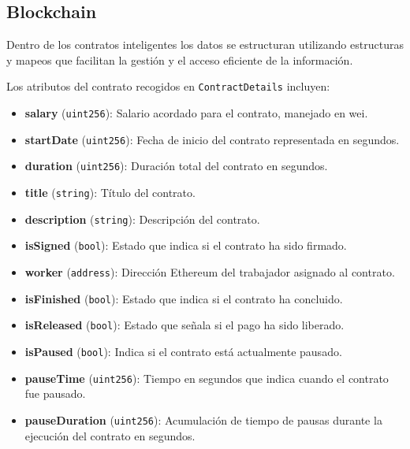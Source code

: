 \subsection{Blockchain}

Dentro de los contratos inteligentes los datos se estructuran utilizando estructuras y mapeos que facilitan la gestión y el acceso eficiente de la información. 

Los atributos del contrato recogidos en  \texttt{ContractDetails} incluyen:
\begin{itemize}
    \item \textbf{salary} (\texttt{uint256}): Salario acordado para el
 	 contrato, manejado en wei.
    \item \textbf{startDate} (\texttt{uint256}): Fecha de inicio del
     contrato representada en segundos.
    \item \textbf{duration} (\texttt{uint256}): Duración total del contrato
     en segundos.
    \item \textbf{title} (\texttt{string}): Título del contrato.
    \item \textbf{description} (\texttt{string}): Descripción del
     contrato.
    \item \textbf{isSigned} (\texttt{bool}): Estado que indica si el
     contrato ha sido firmado.
    \item \textbf{worker} (\texttt{address}): Dirección Ethereum del
     trabajador asignado al contrato.
    \item \textbf{isFinished} (\texttt{bool}): Estado que indica si el
     contrato ha concluido.
    \item \textbf{isReleased} (\texttt{bool}): Estado que señala si el pago
     ha sido liberado.
    \item \textbf{isPaused} (\texttt{bool}): Indica si el contrato está
     actualmente pausado.
    \item \textbf{pauseTime} (\texttt{uint256}): Tiempo en segundos que
     indica cuando el contrato fue pausado.
    \item \textbf{pauseDuration} (\texttt{uint256}): Acumulación de tiempo
     de pausas durante la ejecución del contrato en segundos.
\end{itemize}

